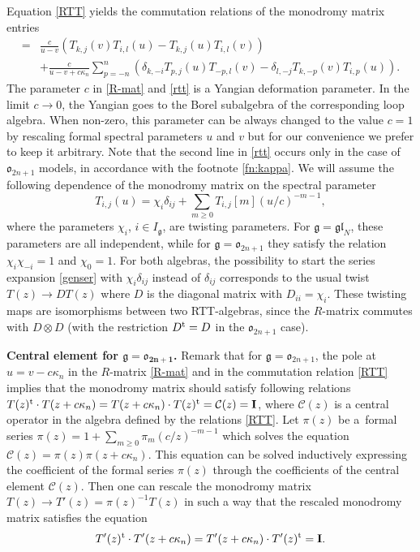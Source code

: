 \documentclass[pdftex]{sigma}
\theoremstyle{definition}
\def\r#1{\eqref{#1}}
\def\Ig{I_{\mathfrak{g}}}
\def\vk{\chi}
\begin{document}
Equation \eqref{RTT} yields the commutation relations of the monodromy matrix entries
\begin{align}
 [ T_{i,j}(u), T_{k,l}(v) ] ={}&
 \frac{c}{u-v}( T_{k,j}(v)T_{i,l}(u) - T_{k,j}(u) T_{i,l}(v) )\nonumber\\
 &+\frac{c}{u-v+c\kappa_n}\sum_{p=-n}^n(\delta_{k,-i}
 T_{p,j}(u)T_{-p,l}(v)-
 \delta_{l,-j} T_{k,-p}(v)T_{i,p}(u)).\label{rtt}
\end{align}
The parameter $c$ in \r{R-mat} and \r{rtt} is a Yangian deformation parameter.
In the limit $c\to 0$, the Yangian goes to the Borel subalgebra of the
corresponding
loop algebra. When non-zero, this parameter can be always changed to the value $c=1$
by rescaling formal spectral parameters $u$ and $v$ but for our convenience we prefer to keep it arbitrary.
Note that the second line in \eqref{rtt} occurs only in the case of $\mathfrak{o}_{2n+1}$ models, in accordance with the footnote \ref{fn:kappa}.
We will assume the following dependence of the monodromy matrix on the
spectral parameter
\begin{equation}\label{genser}
T_{i,j}(u)=\vk_i \delta_{ij}+\sum_{m\geq0} T_{i,j}[m](u/c)^{-m-1} ,
\end{equation}
where the parameters $\vk_i$, $i\in\Ig$, are twisting parameters.
For $\mathfrak{g}=\mathfrak{gl}_N$, these parameters are all independent, while for $\mathfrak{g}=\mathfrak{o}_{2n+1}$ they satisfy the relation
$\vk_i\vk_{-i}=1$ and $\vk_0 = 1$.
For both algebras, the possibility to start
the series expansion \r{genser}
with $\chi_i \delta_{ij}$ instead of $\delta_{ij}$
corresponds to the usual twist $T(z)\to D T(z)$ where $D$ is the diagonal matrix with $D_{ii}=\chi_i$.
These twisting maps are isomorphisms between two RTT-algebras, since the $R$-matrix commutes with $D\otimes D$ (with the restriction $D^{\rm t} = D$ in the $\mathfrak{o}_{2n+1}$ case).


{\bf Central element for $\boldsymbol{\mathfrak{g}=\mathfrak{o}_{2n+1}}$.}
Remark that for $\mathfrak{g}=\mathfrak{o}_{2n+1}$,
the pole at $u=v-c\kappa_n$ in the $R$-matrix \r{R-mat}
and in the commutation relation \r{RTT} implies that the monodromy matrix should satisfy following relations \cite{JLM18}
$
T(z)^{\rm t}\cdot T(z+c\kappa_n)= T(z+c\kappa_n)\cdot T(z)^{\rm t}=
\mathcal{C}(z)= \mathbf{I}$,
where $\mathcal{C}(z)$ is a central operator in the algebra defined by the relations \eqref{RTT}.
Let $\pi(z)$ be a~formal series $\pi(z)=1+\sum_{m\geq0}\pi_m (c/z)^{-m-1}$ which
solves the equation
$
\mathcal{C}(z)=\pi(z) \pi(z+c\kappa_n)$.
This equation can be solved inductively expressing the
coefficient of the formal series $\pi(z)$ through the coefficients of the
central element $\mathcal{C}(z)$. Then one can rescale the monodromy matrix~${
T(z)\to T'(z) = \pi(z)^{-1} T(z)}
$
in such a way that the rescaled monodromy matrix satisfies the equation
\begin{equation}\label{cen3}
 T'(z)^{\rm t}\cdot T'(z+c\kappa_n)= T'(z+c\kappa_n)\cdot T'(z)^{\rm t} = \mathbf{I} .
\end{equation}
\end{document}
